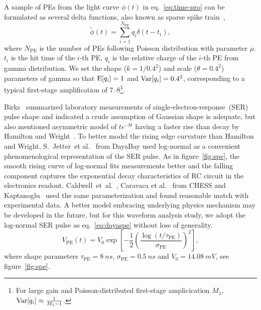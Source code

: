 A sample of PEs from the light curve $\phi(t)$ in eq.~\eqref{eq:time-pro} can be formulated as several delta functions, also known as sparse spike train~\cite{levy_reconstruction_1981}, 
\begin{equation}
  \label{eq:lc-sample}
  \tilde{\phi}(t) = \sum_{i=1}^{N_{\mathrm{PE}}} q_i \delta(t-t_i),
\end{equation}
where $N_\mathrm{PE}$ is the number of PEs following Poisson distribution with parameter $\mu$.  $t_i$ is the hit time of the $i$-th PE, $q_i$ is the relative charge of the $i$-th PE from gamma distribution.  We set the shape ($k=1/0.4^2$) and scale ($\theta=0.4^2$) parameters of gamma so that $\operatorname{E}[q_i] = 1$ and $\operatorname{Var}[q_i] = 0.4^2$, corresponding to a typical first-stage amplification of 7--8\footnote{For large gain and Poisson-distributed first-stage amplicication $M_1$, $\operatorname{Var}[q_i] \approx \frac{1}{M_1-1}$.}.

Birks~\cite{birks_theory_1967} summarized laboratory measurements of single-electron-response~(SER) pulse shape and indicated a crude assumption of Gaussian shape is adequate, but also mentioned asymmetric model of $t e^{-bt}$ having a faster rise than decay by Hamilton and Wright~\cite{hamilton_transit_1956}.  To better model the rising edge curvature than Hamilton and Wright, S.~Jetter~et al.~\cite{jetter_pmt_2012} from DayaBay used log-normal as a convenient phenomenological representation of the SER pulse.  As in figure~\ref{fig:spe}, the smooth rising curve of log-normal fits measurements better and the falling component captures the exponential decay characteristics of RC circuit in the electronics readout.  Caldwell~et~al.~\cite{caldwell_characterization_2013}, Caravaca et al.~\cite{caravaca_experiment_2017} from CHESS and Kaptanoglu~\cite{kaptanoglu_characterization_2018} used the same parameterization and found reasonable match with experimental data.  A better model embracing underlying physics mechanism may be developed in the future, but for this waveform analysis study, we adopt the log-normal SER pulse as eq.~\eqref{eq:dayaspe} without loss of generality.
\begin{equation}
  V_\mathrm{PE}(t) = V_{0}\exp\left[-\frac{1}{2}\left(\frac{\log(t/\tau_\mathrm{PE})}{\sigma_\mathrm{PE}}\right)^{2}\right],
  \label{eq:dayaspe}
\end{equation}
where shape parameters $\tau_\mathrm{PE}=\SI{8}{ns}$, $\sigma_\mathrm{PE}=\SI{0.5}{ns}$ and $V_{0}=\SI{14.08}{mV}$, see figure~\ref{fig:spe}.

